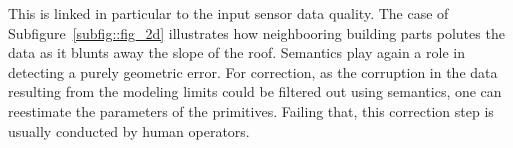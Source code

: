                 \begin{figure}[H]
                    \centering
                \end{figure}

                This is linked in particular to the input sensor data quality.
                The case of Subfigure~\ref{subfig::fig_2d} illustrates how neighbooring building parts polutes the data as it blunts away the slope of the roof.
                Semantics play again a role in detecting a purely geometric error.
                For correction, as the corruption in the data resulting from the modeling limits could be filtered out using semantics, one can reestimate the parameters of the primitives.
                Failing that, this correction step is usually conducted by human operators.

